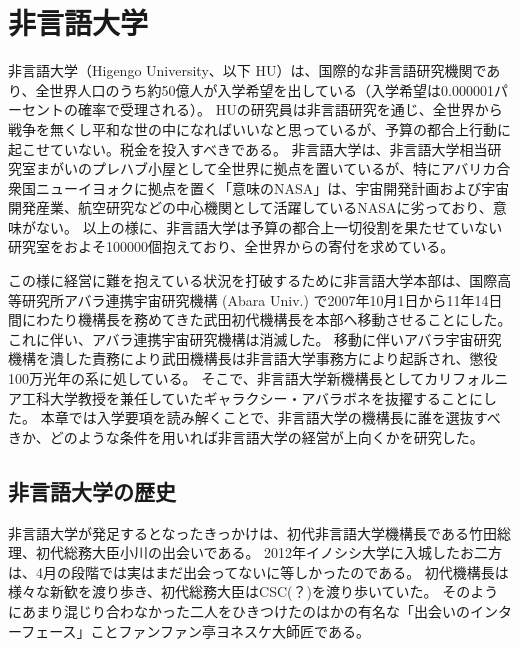 
\section{非言語大学}
非言語大学（Higengo University、以下 HU）は、国際的な非言語研究機関であり、全世界人口のうち約50億人が入学希望を出している（入学希望は0.000001パーセントの確率で受理される）。
HUの研究員は非言語研究を通じ、全世界から戦争を無くし平和な世の中になればいいなと思っているが、予算の都合上行動に起こせていない。税金を投入すべきである。
非言語大学は、非言語大学相当研究室まがいのプレハブ小屋として全世界に拠点を置いているが、特にアバリカ合衆国ニューイヨォクに拠点を置く「意味のNASA」は、宇宙開発計画および宇宙開発産業、航空研究などの中心機関として活躍しているNASAに劣っており、意味がない。
以上の様に、非言語大学は予算の都合上一切役割を果たせていない研究室をおよそ100000個抱えており、全世界からの寄付を求めている。
\par
この様に経営に難を抱えている状況を打破するために非言語大学本部は、国際高等研究所アバラ連携宇宙研究機構 (Abara Univ.) で2007年10月1日から11年14日間にわたり機構長を務めてきた武田初代機構長を本部へ移動させることにした。
これに伴い、アバラ連携宇宙研究機構は消滅した。
移動に伴いアバラ宇宙研究機構を潰した責務により武田機構長は非言語大学事務方により起訴され、懲役100万光年の系に処している。
そこで、非言語大学新機構長としてカリフォルニア工科大学教授を兼任していたギャラクシー・アバラボネを抜擢することにした。
本章では入学要項を読み解くことで、非言語大学の機構長に誰を選抜すべきか、どのような条件を用いれば非言語大学の経営が上向くかを研究した。

\subsection{非言語大学の歴史}
非言語大学が発足するとなったきっかけは、初代非言語大学機構長である竹田総理、初代総務大臣小川の出会いである。
2012年イノシシ大学に入城したお二方は、4月の段階では実はまだ出会ってないに等しかったのである。
初代機構長は様々な新歓を渡り歩き、初代総務大臣はCSC(？)を渡り歩いていた。
そのようにあまり混じり合わなかった二人をひきつけたのはかの有名な「出会いのインターフェース」ことファンファン亭ヨネスケ大師匠である。

